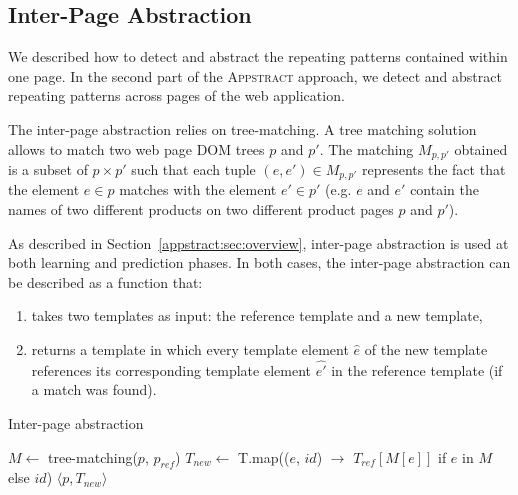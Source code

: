 

\subsection{Inter-Page Abstraction}\label{appstract:sec:inter}
We described how to detect and abstract the repeating patterns contained within one page. 
In the second part of the \textsc{Appstract} approach, we detect and abstract repeating patterns across pages of the web application.

The inter-page abstraction relies on tree-matching.
A tree matching solution allows to match two web page DOM trees $p$ and $p'$. 
The matching $M_{p, p'}$ obtained is a subset of  $p \times p'$ such that each tuple $(e, e') \in M_{p, p'}$ represents the fact that the element $e \in p$ matches with the element $e' \in p'$ (e.g. $e$ and $e'$ contain the names of two different products on two different product pages $p$ and $p'$).

As described in Section~\ref{appstract:sec:overview}, inter-page abstraction is used at both learning and prediction phases. In both cases, the inter-page abstraction can be described as a function that:
\begin{enumerate}
    \item takes two templates as input: the reference template and a new template,
    \item returns a template in which every template element $\hat{e}$ of the new template references its corresponding template element $\hat{e'}$ in the reference template (if a match was found).
\end{enumerate}

\begin{algorithm}
    \caption{Inter-page abstraction}\label{appstract:alg:inter-page}
    \begin{algorithmic}[1]
          \State $M \gets$ tree-matching($p$, $p_{ref}$)
          \State $T_{new} \gets$ T.map(($e$, $id$) $\to$ $T_{ref}[M[e]]$ if $e$ in $M$ else $id$)
          \State \Return $\langle p, T_{new} \rangle$
      \EndFunction
    \end{algorithmic}
\end{algorithm}

